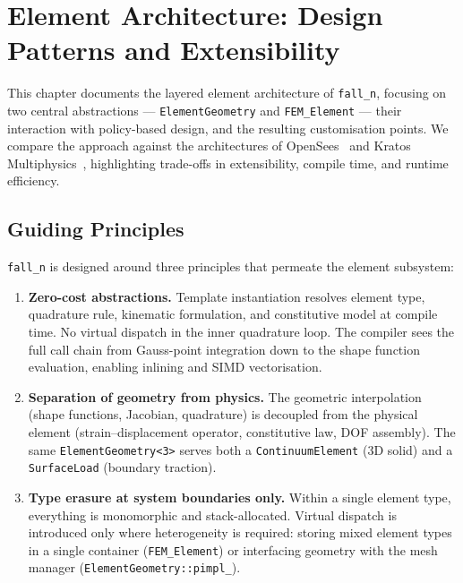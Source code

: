
\chapter{Element Architecture: Design Patterns and Extensibility}
\label{ch:architecture}

This chapter documents the layered element architecture of \texttt{fall\_n},
focusing on two central abstractions --- \texttt{ElementGeometry} and
\texttt{FEM\_Element} --- their interaction with policy-based design, and the
resulting customisation points.  We compare the approach against the
architectures of OpenSees~\cite{OpenSees} and Kratos
Multiphysics~\cite{Kratos}, highlighting trade-offs in extensibility, compile
time, and runtime efficiency.


\section{Guiding Principles}
\label{sec:principles}

\texttt{fall\_n} is designed around three principles that permeate the element
subsystem:

\begin{enumerate}[nosep]
  \item \textbf{Zero-cost abstractions.}  Template instantiation resolves
        element type, quadrature rule, kinematic formulation, and constitutive
        model at compile time.  No virtual dispatch in the inner quadrature
        loop.  The compiler sees the full call chain from Gauss-point
        integration down to the shape function evaluation, enabling inlining
        and SIMD vectorisation.

  \item \textbf{Separation of geometry from physics.}  The geometric
        interpolation (shape functions, Jacobian, quadrature) is decoupled
        from the physical element (strain--displacement operator, constitutive
        law, DOF assembly).  The same \texttt{ElementGeometry<3>} serves both
        a \texttt{ContinuumElement} (3D solid) and a \texttt{SurfaceLoad}
        (boundary traction).

  \item \textbf{Type erasure at system boundaries only.}  Within a single
        element type, everything is monomorphic and stack-allocated.  Virtual
        dispatch is introduced only where heterogeneity is required: storing
        mixed element types in a single container (\texttt{FEM\_Element}) or
        interfacing geometry with the mesh manager
        (\texttt{ElementGeometry::pimpl\_}).
\end{enumerate}

